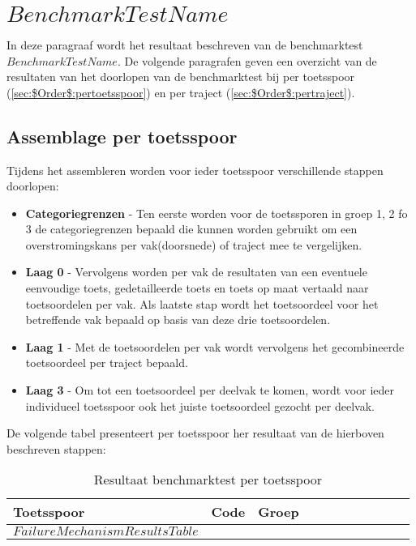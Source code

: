 \section{$BenchmarkTestName$}
	\label{ch:benchmarktTest$Order$}
In deze paragraaf wordt het resultaat beschreven van de benchmarktest \textit{$BenchmarkTestName$}. De volgende paragrafen geven een overzicht van de resultaten van het doorlopen van de benchmarktest bij per toetsspoor (\autoref{sec:$Order$:pertoetsspoor}) en per traject (\autoref{sec:$Order$:pertraject}).

\subsection{Assemblage per toetsspoor}
	\label{sec:$Order$:pertoetsspoor}
Tijdens het assembleren worden voor ieder toetsspoor verschillende stappen doorlopen:
\begin{itemize}
	\item \textbf{Categoriegrenzen} - Ten eerste worden voor de toetssporen in groep 1, 2 fo 3 de categoriegrenzen bepaald die kunnen worden gebruikt om een overstromingskans per vak(doorsnede) of traject mee te vergelijken.
	\item \textbf{Laag 0} - Vervolgens worden per vak de resultaten van een eventuele eenvoudige toets, gedetailleerde toets en toets op maat vertaald naar toetsoordelen per vak. Als laatste stap wordt het toetsoordeel voor het betreffende vak bepaald op basis van deze drie toetsoordelen.
	\item \textbf{Laag 1} - Met de toetsoordelen per vak wordt vervolgens het gecombineerde toetsoordeel per traject bepaald.
	\item \textbf{Laag 3} - Om tot een toetsoordeel per deelvak te komen, wordt voor ieder individueel toetsspoor ook het juiste toetsoordeel gezocht per deelvak.
\end{itemize}

De volgende tabel presenteert per toetsspoor her resultaat van de hierboven beschreven stappen:

\begin{longtable}[]{@{}l l l | c c c c c c c c@{}}
	\caption{Resultaat benchmarktest per toetsspoor	\label{tab:DocumentatieBijAssemblageRekenkern}}\\
	\T
	Toetsspoor & Code & Groep & \rotatebox{90}{Categoriegrenzen} & \rotatebox{90}{Eenvoudige toets} & \rotatebox{90}{Gedetailleerde toets} & \rotatebox{90}{Toets op maat} & \rotatebox{90}{Toetsoordeel per vak} & \rotatebox{90}{Toetsoordeel per traject} & \rotatebox{90}{Toetsoordeel per traject (tijdelijk)} & \rotatebox{90}{Toetsoordeel per deelvak}\B \\
	\endhead
	\hline\T
$FailureMechanismResultsTable$
	\B \\ \hline
\end{longtable}

